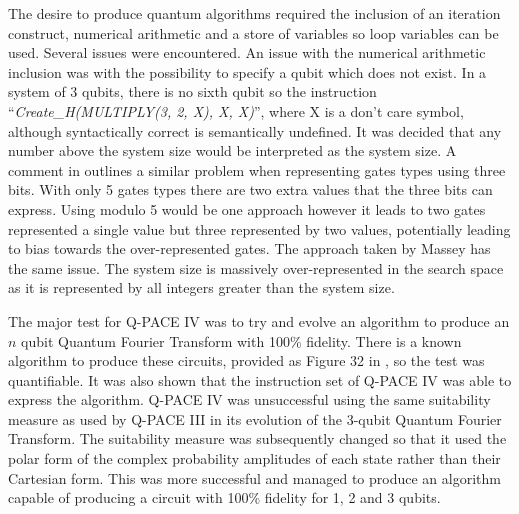 The desire to produce quantum algorithms required the inclusion of an iteration construct, numerical arithmetic and a store of variables so loop variables can be used.
Several issues were encountered.
An issue with the numerical arithmetic inclusion was with the possibility to specify a qubit which does not exist.
In a system of 3 qubits, there is no sixth qubit so the instruction ``\emph{Create\_H(MULTIPLY(3, 2, X), X, X)}''\cite{masseythesis}, where X is a don't care symbol, although syntactically correct is semantically undefined.
It was decided that any number above the system size would be interpreted as the system size.
A comment in \cite{Stepney07searchingfor} outlines a similar problem when representing gates types using three bits.
With only 5 gates types there are two extra values that the three bits can express.
Using modulo 5 would be one approach however it leads to two gates represented a single value but three represented by two values, potentially leading to bias towards the over-represented gates.
The approach taken by Massey has the same issue.
The system size is massively over-represented in the search space as it is represented by all integers greater than the system size.


The major test for Q-PACE IV was to try and evolve an algorithm to produce an $n$ qubit Quantum Fourier Transform with 100\% fidelity.
There is a known algorithm to produce these circuits, provided as Figure 32 in \cite{masseythesis}, so the test was quantifiable.
It was also shown that the instruction set of Q-PACE IV was able to express the algorithm.
Q-PACE IV was unsuccessful using the same suitability measure as used by Q-PACE III in its evolution of the 3-qubit Quantum Fourier Transform.
The suitability measure was subsequently changed so that it used the polar form of the complex probability amplitudes of each state rather than their Cartesian form.
This was more successful and managed to produce an algorithm capable of producing a circuit with 100\% fidelity for 1, 2 and 3 qubits.

